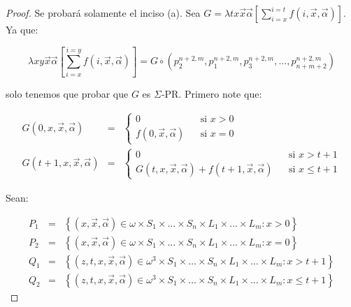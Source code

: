   \begin{proof}
    \par Se probará solamente el inciso (a). Sea $G = \lambda tx\vec{x}\vec{\alpha} \left[\sum_{i=x}^{i=t} f(i,\vec{x},
    \vec{\alpha})\right]$. Ya que:

    \[
      \lambda xy\vec{x}\vec{\alpha}\left[\sum_{i=x}^{i=y} f(i, \vec{x}, \vec{\alpha})\right] = G \circ \left(
      p_{2}^{n+2,m}, p_{1}^{n+2,m}, p_{3}^{n+2,m}, \dotsc, p_{n+m+2}^{n+2,m}\right)
    \]

    \par solo tenemos que probar que $G$ es $\Sigma$-PR. Primero note que:

    \begin{eqnarray}
      \nonumber G(0,x,\vec{x},\vec{\alpha}) &=& \left\{
        \begin{array}{lll}
          0 && \text{si } x > 0 \\
          f(0,\vec{x},\vec{\alpha}) && \text{si } x = 0
        \end{array}\right. \\
      \nonumber G(t+1,x,\vec{x},\vec{\alpha}) &=& \left\{
        \begin{array}{lll}
          0 && \text{si } x > t+1 \\
          G(t,x,\vec{x},\vec{\alpha}) + f(t+1,\vec{x},\vec{\alpha}) && \text{si } x \leq t+1
        \end{array} \right.
    \end{eqnarray}

    \par Sean:

    \begin{eqnarray}
      \nonumber P_{1} &=& \left\{(x,\vec{x},\vec{\alpha}) \in \omega \times S_{1} \times \dotsc \times S_{n} \times
        L_{1} \times \dotsc \times L_{m}: x > 0 \right\} \\
      \nonumber P_{2} &=& \left\{(x,\vec{x},\vec{\alpha}) \in \omega \times S_{1} \times \dotsc \times S_{n} \times
        L_{1} \times \dotsc \times L_{m}: x = 0 \right\} \\
      \nonumber Q_{1} &=& \left\{(z,t,x,\vec{x},\vec{\alpha}) \in \omega^{3} \times S_{1} \times \dotsc \times S_{n}
        \times L_{1} \times \dotsc \times L_{m}: x > t+1\right\} \\
      \nonumber Q_{2} &=& \left\{(z,t,x,\vec{x},\vec{\alpha}) \in \omega^{3} \times S_{1} \times \dotsc \times S_{n}
        \times L_{1} \times \dotsc \times L_{m}: x \leq t+1\right\}
    \end{eqnarray}


\end{proof}
